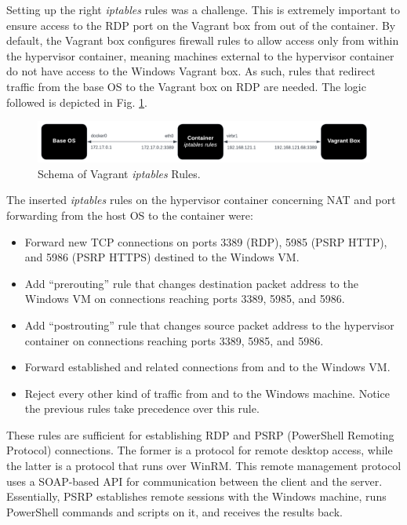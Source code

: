 Setting up the right \textit{iptables} rules was a challenge. This is extremely important to ensure access to the RDP port on the Vagrant box from out of the container. By default, the Vagrant box configures firewall rules to allow access only from within the hypervisor container, meaning machines external to the hypervisor container do not have access to the Windows Vagrant box. As such, rules that redirect traffic from the base OS to the Vagrant box on RDP are needed. The logic followed is depicted in Fig. \ref{fig:vagrant_iptables_rules}.

\begin{figure}[H]
    \includegraphics[width=13cm]{figures/vagrant_iptables_rules.pdf}
    \caption{Schema of Vagrant \textit{iptables} Rules.}
    \label{fig:vagrant_iptables_rules}
\end{figure}

The inserted \textit{iptables} rules on the hypervisor container concerning NAT and port forwarding from the host OS to the container were:

\begin{itemize}
    \item Forward new TCP connections on ports 3389 (RDP), 5985 (PSRP HTTP), and 5986 (PSRP HTTPS) destined to the Windows VM.
    \item Add ``prerouting'' rule that changes destination packet address to the Windows VM on connections reaching ports 3389, 5985, and 5986.
    \item Add ``postrouting'' rule that changes source packet address to the hypervisor container on connections reaching ports 3389, 5985, and 5986.
    \item Forward established and related connections from and to the Windows VM.
    \item Reject every other kind of traffic from and to the Windows machine. Notice the previous rules take precedence over this rule.
\end{itemize}

These rules are sufficient for establishing RDP and PSRP (PowerShell Remoting Protocol) connections. The former is a protocol for remote desktop access, while the latter is a protocol that runs over WinRM. This remote management protocol uses a SOAP-based API for communication between the client and the server. Essentially, PSRP establishes remote sessions with the Windows machine, runs PowerShell commands and scripts on it, and receives the results back.

